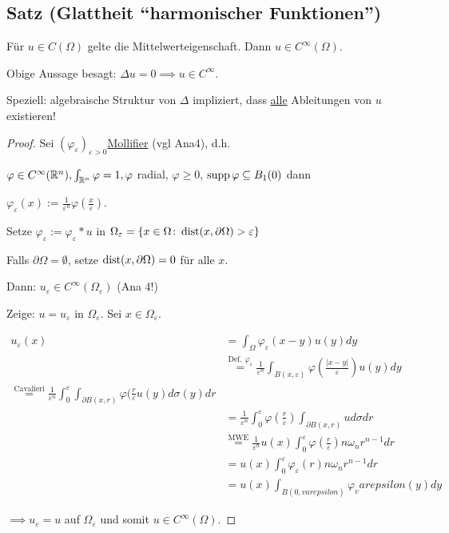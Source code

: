\subsection{Satz (Glattheit ``harmonischer Funktionen'')}

Für $u \in C(\Omega)$ gelte die Mittelwerteigenschaft. 
Dann $u \in C^\infty(\Omega)$.

\begin{bem}
  Obige Aussage besagt: $\Delta u = 0 \implies u \in C^\infty$.

  Speziell: algebraische Struktur von $\Delta$ impliziert, dass \underline{alle} Ableitungen von $u$ existieren!
\end{bem}

\begin{proof}
  Sei $(\varphi_\varepsilon)_{\varepsilon > 0} $\underline{Mollifier} (vgl Ana4), d.h.
  
  $\varphi \in C^\infty(\mathbb{R}^n), \int_{\mathbb{R}^n} \varphi = 1, \varphi $ radial, $\varphi \geq 0$, $\operatorname{supp} \varphi \subseteq B_1(0)$ dann

  $\varphi_\varepsilon(x) := \frac{1}{\varepsilon^n} \varphi(\frac{x}{\varepsilon})$.

  Setze $\varphi_\varepsilon := \varphi_\varepsilon \ast u$ in $\Omega_\varepsilon = \{x \in \Omega \colon \operatorname{dist}(x, \partial \Omega) > \varepsilon \}$

  {\tiny{Falls $\partial \Omega = \emptyset$, setze $\operatorname{dist}(x, \partial\Omega) = 0$ für alle $x$.}}

  Dann: $u_\varepsilon \in C^\infty(\Omega_\varepsilon)$ (Ana 4!)

  Zeige: $u = u_\varepsilon$ in $\Omega_\varepsilon$. Sei $x \in \Omega_\varepsilon$.

  \begin{align*}
    u_\varepsilon(x) &= \int_\Omega \varphi_\varepsilon(x - y) u(y) dy \\
    &\overset{\text{Def. } \varphi_\varepsilon}{=} \frac{1}{\varepsilon^n} \int_{B(x,\varepsilon)} \varphi(\frac{|x - y|}{\varepsilon}) u(y) dy \\
    \overset{\text{Cavalieri}}{=} \frac{1}{\varepsilon^n} \int_0^\varepsilon \int_{\partial B(x,r)} \varphi(\frac{r}{\varepsilon} u(y) d\sigma(y) dr \\
    &= \frac{1}{\varepsilon^n} \int_0^\varepsilon \varphi(\frac{r}{\varepsilon}) \int_{\partial B(x,r)} u d\sigma dr \\
    &\overset{\text{MWE}}{=} \frac{1}{\varepsilon^n} u(x) \int_0^\varepsilon \varphi(\frac{r}{\varepsilon}) n \omega_n r^{n - 1} dr \\
    &= u(x) \int_0^\varepsilon \varphi_\varepsilon(r) n \omega_n r^{n - 1} dr \\
    &= u(x) \int_{B(0,varepsilon)} \varphi_varepsilon (y) dy
  \end{align*}

  $\implies u_\varepsilon = u$ auf $\Omega_\varepsilon$ und somit $u \in C^\infty(\Omega)$.
\end{proof}

